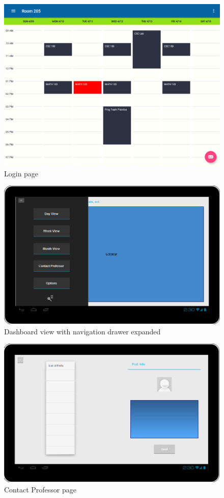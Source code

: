 \begin{figure}
\centering
  \includegraphics[scale=0.4]{dashboard_final.png}
  \caption{Login page}
  \label{fig:finallogin}
\end{figure}

\begin{figure}
\centering
  \includegraphics[scale=0.4]{navigationdrawer.png}
  \caption{Dashboard view with navigation drawer expanded}
  \label{fig:navdrawer}
\end{figure}

\begin{figure}
\centering
  \includegraphics[scale=0.4]{contact.png}
  \caption{Contact Professor page}
  \label{fig:contactprof}
\end{figure}

